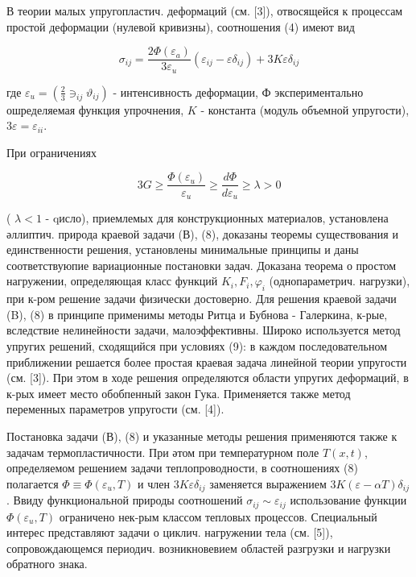 \documentclass[10pt]{article}
\begin{document}
В теории малых упругопластич. деформаций (см. [3]), отвосящейся к процессам простой деформации (нулевой кривизны), соотношения (4) имеют вид



\[

\sigma_{i j}=\frac{2 \Phi\left(\varepsilon_{a}\right)}{3 \varepsilon_{u}}\left(\varepsilon_{i j}-\varepsilon \delta_{i j}\right)+3 K \varepsilon \delta_{i j}

\]



где $\varepsilon_{u}=\left(\frac{2}{3} \ni_{i j} \vartheta_{i j}\right)$ - интенсивность деформации, Ф экспериментально ошределяемая функция упрочнения, $K$ - константа (модуль объемной упругости), $3 \varepsilon=\varepsilon_{i i}$.



При ограничениях



\[

3 G \geqslant \frac{\Phi\left(\varepsilon_{u}\right)}{\varepsilon_{u}} \geqslant \frac{d \Phi}{d \varepsilon_{u}} \geqslant \lambda>0

\]



( $\lambda<1$ - qисло), приемлемых для конструкционных материалов, установлена әллиптич. природа краевой задачи (В), (8), доказаны теоремы существования и единственности решения, установлены минимальные принципы и даны соответствуюпие вариационные постановки задач. Доказана теорема о простом нагружении, определяющая класс функций $K_{i}, F_{i}, \varphi_{i}$ (однопараметрич. нагрузки), при к-ром решение задачи физически достоверно. Для решения краевой задачи (B), (8) в принципе применимы методы Ритца и Бубнова - Галеркина, к-рые, вследствие нелинейности задачи, малоэффективны. Широко используется метод упругих решений, сходящийся при условиях (9): в каждом последовательном приближении решается более простая краевая задача линейной теории упругости (см. [3]). При этом в ходе решения определяются области упругих деформаций, в к-рых имеет место обобпенный закон Гука. Применяется также метод переменных параметров упругости (см. [4]).



Постановка задачи (В), (8) и указанные методы решения применяются также к задачам термопластичности. При әтом при температурном поле $T(x, t)$, определяемом решением задачи теплопроводности, в соотношениях (8) полагается $\Phi \equiv \Phi\left(\varepsilon_{u}, T\right)$ и член $3 K \varepsilon \delta_{i j}$ заменяется выражением $3 K(\varepsilon-\alpha T) \delta_{i j}$. Ввиду функциональной природы соотношений $\sigma_{i j} \sim \varepsilon_{i j}$ использование функции $\Phi\left(\varepsilon_{u}, T\right)$ ограничено нек-рым классом тепловых процессов. Специальный интерес представляют задачи о циклич. нагружении тела (см. [5]), сопровождающемся периодич. возникновевием областей разгрузки и нагрузки обратного знака.
\end{document}
